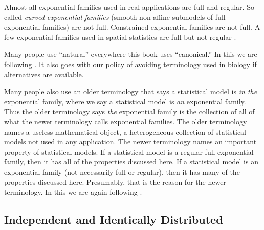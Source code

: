 Almost all exponential families used in real applications are full and regular.
So-called \emph{curved exponential families} (smooth non-affine submodels of
full exponential families) are not full.
Constrained exponential families \citep{geyer-constrained} are not full.
A few exponential families used in spatial statistics are full but not regular
\citep{geyer-moller}.

Many people use ``natural'' everywhere this book uses ``canonical.''
In this we are following \citet{barndorff-nielsen}.
It also goes with our policy of avoiding terminology used in biology
if alternatives are available.

Many people also use an older terminology that says a statistical model
is \emph{in the} exponential family, where we say a statistical model
is \emph{an} exponential family.
Thus the older terminology says \emph{the} exponential
family is the collection of all of what the newer terminology calls
exponential families.  The older terminology names a useless
mathematical object, a heterogeneous collection of statistical models not
used in any application.
The newer terminology names an important property of statistical models.
If a statistical model is a regular full exponential family, then it
has all of the properties discussed here.
If a statistical model is an exponential family (not necessarily full or
regular), then it has many of the properties discussed here.
Presumably, that is the reason for the newer terminology.
In this we are again following \citet{barndorff-nielsen}.

\subsection{Independent and Identically Distributed}
\label{sec:iid}

